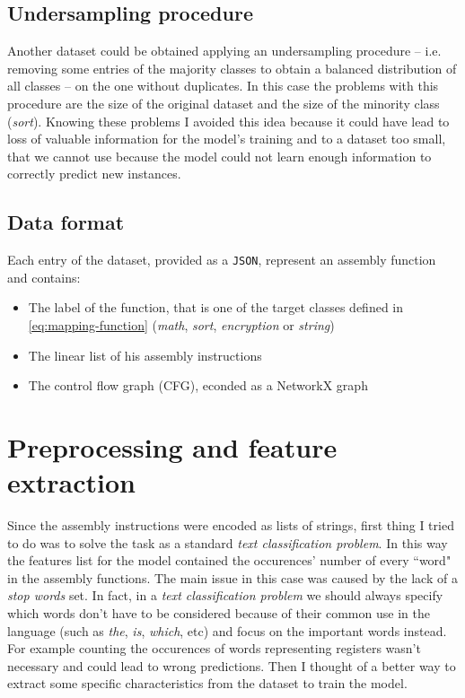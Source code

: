 \documentclass[11pt]{article}
\begin{document}
	\subsection{Undersampling procedure}
	Another dataset could be obtained applying an undersampling procedure
	-- i.e. removing some entries of the majority classes to obtain a balanced distribution
	of all classes -- on the one without duplicates. 
	In this case the problems with this procedure are the size of the original dataset
	and the size of the minority class (\textit{sort}). Knowing these problems
	I avoided this idea because it could have lead to loss of valuable information
	for the model's training and to a dataset too small, that we cannot use because
	the model could not learn enough information to correctly predict new instances.


	\subsection{Data format}
	Each entry of the dataset, provided as a \texttt{JSON}, represent an assembly
	function and contains:
	\begin{itemize}
		\item The label of the function, that is one of the target classes defined
		in \autoref{eq:mapping-function} (\textit{math}, \textit{sort}, \textit{encryption} or \textit{string})
		\item The linear list of his assembly instructions
		\item The control flow graph (CFG), econded as a NetworkX graph
	\end{itemize}



	\section{Preprocessing and feature extraction} \label{subsec:feature-extraction}
	Since the assembly instructions were encoded as lists of strings, first thing
	I tried to do was to solve the task as a standard \textit{text classification
	problem}. In this way the features list for the model contained the 
	occurences' number of every ``word" in the assembly functions.
	The main issue in this case was caused by the lack of a \textit{stop words}
	set. In fact, in a \textit{text classification problem} we should always
	specify which words don't have to be considered because of their common use
	in the language (such as \textit{the}, \textit{is}, \textit{which}, etc) and
	focus on the important words instead.
	For example counting the occurences of words representing registers wasn't
	necessary and could lead to wrong predictions.
	Then I thought of a better way to extract some specific
	characteristics from the dataset to train the model.
\end{document}
